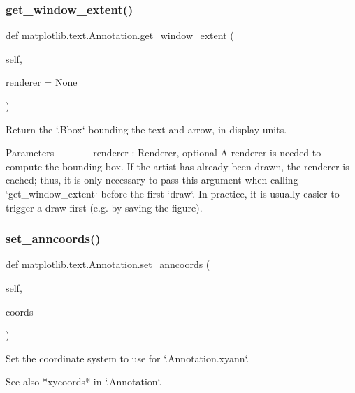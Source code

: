 \subsubsection{\texorpdfstring{get\+\_\+window\+\_\+extent()}{get\_window\_extent()}}
{\footnotesize\ttfamily def matplotlib.\+text.\+Annotation.\+get\+\_\+window\+\_\+extent (\begin{DoxyParamCaption}\item[{}]{self,  }\item[{}]{renderer = {\ttfamily None} }\end{DoxyParamCaption})}

\begin{DoxyVerb}Return the `.Bbox` bounding the text and arrow, in display units.

Parameters
----------
renderer : Renderer, optional
    A renderer is needed to compute the bounding box.  If the artist
    has already been drawn, the renderer is cached; thus, it is only
    necessary to pass this argument when calling `get_window_extent`
    before the first `draw`.  In practice, it is usually easier to
    trigger a draw first (e.g. by saving the figure).
\end{DoxyVerb}
 \mbox{\label{classmatplotlib_1_1text_1_1Annotation_a67a447f47cb92d617950725500222248}} 
\subsubsection{\texorpdfstring{set\+\_\+anncoords()}{set\_anncoords()}}
{\footnotesize\ttfamily def matplotlib.\+text.\+Annotation.\+set\+\_\+anncoords (\begin{DoxyParamCaption}\item[{}]{self,  }\item[{}]{coords }\end{DoxyParamCaption})}

\begin{DoxyVerb}Set the coordinate system to use for `.Annotation.xyann`.

See also *xycoords* in `.Annotation`.
\end{DoxyVerb}
 \mbox{\label{classmatplotlib_1_1text_1_1Annotation_ab3b4e137cfee034f150cf8c0a5567f14}} 
